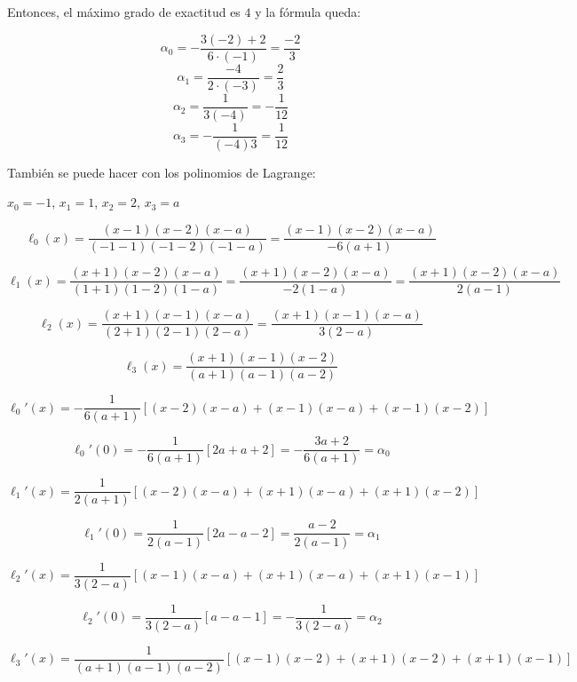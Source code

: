 \documentclass[12pt]{article}
\begin{document}
\begin{ejercicio}[4 puntos]
\begin{enumerate}
        Entonces, el máximo grado de exactitud es $4$ y la fórmula queda:

        $$\alpha_0 = - \dfrac{3(-2) + 2}{6 \cdot (-1)} = \dfrac{-2}{3}$$
        $$\alpha_1 = \dfrac{-4}{2 \cdot (-3)} = \dfrac{2}{3}$$
        $$\alpha_2 = \dfrac{1}{3(-4)} = -\dfrac{1}{12}$$
        $$\alpha_3 = -\dfrac{1}{(-4)3} = \dfrac{1}{12}$$

        \begin{center}
        \end{center}
        
        También se puede hacer con los polinomios de Lagrange:

        $x_0 = -1$, $x_1 = 1$, $x_2 = 2$, $x_3 = a$

        \[
        \ell_0(x) = \frac{(x-1)(x-2)(x-a)}{(-1-1)(-1-2)(-1-a)} = \frac{(x-1)(x-2)(x-a)}{-6(a+1)}
        \]

        \[
        \ell_1(x) = \frac{(x+1)(x-2)(x-a)}{(1+1)(1-2)(1-a)} = \frac{(x+1)(x-2)(x-a)}{-2(1-a)} = \frac{(x+1)(x-2)(x-a)}{2(a-1)}
        \]

        \[
        \ell_2(x) = \frac{(x+1)(x-1)(x-a)}{(2+1)(2-1)(2-a)} = \frac{(x+1)(x-1)(x-a)}{3(2-a)}
        \]

        \[
        \ell_3(x) = \frac{(x+1)(x-1)(x-2)}{(a+1)(a-1)(a-2)}
        \]

        \[
        \ell_0'(x) = -\frac{1}{6(a+1)} \left[ (x-2)(x-a) + (x-1)(x-a) + (x-1)(x-2) \right]
        \]

        \[
        \ell_0'(0) = -\frac{1}{6(a+1)} \left[ 2a + a + 2 \right] = \boxed{-\frac{3a + 2}{6(a+1)} = \alpha_0}
        \]

        \[
        \ell_1'(x) = \frac{1}{2(a+1)} \left[ (x-2)(x-a) + (x+1)(x-a) + (x+1)(x-2) \right]
        \]

        \[
        \ell_1'(0) = \frac{1}{2(a-1)} \left[ 2a - a - 2 \right] = \boxed{\frac{a-2}{2(a-1)} = \alpha_1}
        \]

        \[
        \ell_2'(x) = \frac{1}{3(2-a)} \left[ (x-1)(x-a) + (x+1)(x-a) + (x+1)(x-1) \right]
        \]

        \[
        \ell_2'(0) = \frac{1}{3(2-a)} \left[ a - a - 1 \right] = \boxed{-\frac{1}{3(2-a)} = \alpha_2}
        \]

        \[
        \ell_3'(x) = \frac{1}{(a+1)(a-1)(a-2)} \left[ (x-1)(x-2) + (x+1)(x-2) + (x+1)(x-1) \right]
        \]


\end{enumerate}
\end{ejercicio}
\end{document}
